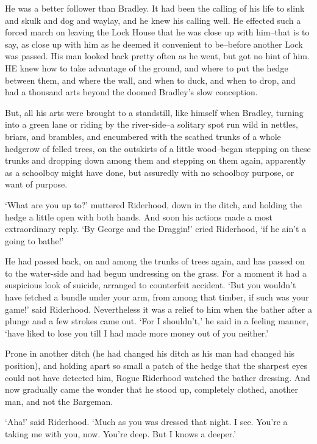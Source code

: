 He was a better follower than Bradley. It had been the calling of his
life to slink and skulk and dog and waylay, and he knew his calling
well. He effected such a forced march on leaving the Lock House that he
was close up with him--that is to say, as close up with him as he deemed
it convenient to be--before another Lock was passed. His man looked back
pretty often as he went, but got no hint of him. HE knew how to take
advantage of the ground, and where to put the hedge between them, and
where the wall, and when to duck, and when to drop, and had a thousand
arts beyond the doomed Bradley’s slow conception.

But, all his arts were brought to a standstill, like himself when
Bradley, turning into a green lane or riding by the river-side--a
solitary spot run wild in nettles, briars, and brambles, and encumbered
with the scathed trunks of a whole hedgerow of felled trees, on the
outskirts of a little wood--began stepping on these trunks and dropping
down among them and stepping on them again, apparently as a schoolboy
might have done, but assuredly with no schoolboy purpose, or want of
purpose.

‘What are you up to?’ muttered Riderhood, down in the ditch, and holding
the hedge a little open with both hands. And soon his actions made a
most extraordinary reply. ‘By George and the Draggin!’ cried Riderhood,
‘if he ain’t a going to bathe!’

He had passed back, on and among the trunks of trees again, and has
passed on to the water-side and had begun undressing on the grass. For
a moment it had a suspicious look of suicide, arranged to counterfeit
accident. ‘But you wouldn’t have fetched a bundle under your arm, from
among that timber, if such was your game!’ said Riderhood. Nevertheless
it was a relief to him when the bather after a plunge and a few strokes
came out. ‘For I shouldn’t,’ he said in a feeling manner, ‘have liked to
lose you till I had made more money out of you neither.’

Prone in another ditch (he had changed his ditch as his man had changed
his position), and holding apart so small a patch of the hedge that the
sharpest eyes could not have detected him, Rogue Riderhood watched the
bather dressing. And now gradually came the wonder that he stood up,
completely clothed, another man, and not the Bargeman.

‘Aha!’ said Riderhood. ‘Much as you was dressed that night. I see.
You’re a taking me with you, now. You’re deep. But I knows a deeper.’


